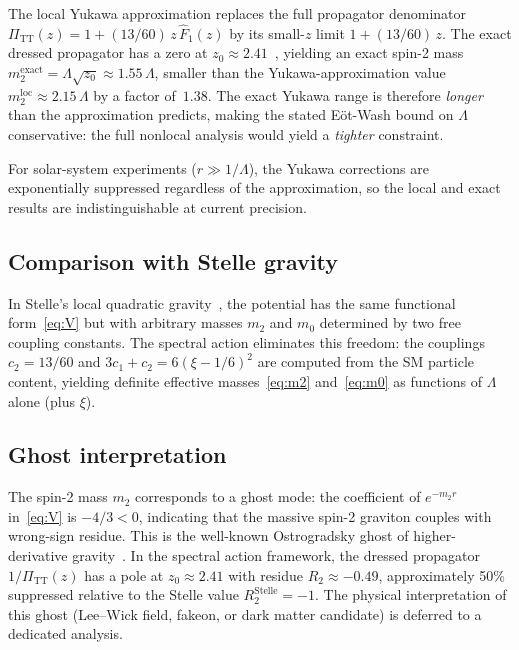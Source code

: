 \documentclass[aps,prd,twocolumn,superscriptaddress,nofootinbib,floatfix]{revtex4-2}
\newcommand{\PiTT}{\Pi_{\mathrm{TT}}}
\begin{document}
The local Yukawa approximation replaces the full propagator denominator
$\PiTT(z) = 1 + (13/60)\,z\,\hat{F}_1(z)$ by its small-$z$ limit
$1 + (13/60)\,z$.  The exact dressed propagator has a zero at
$z_0 \approx 2.41$~\cite{Alfyorov:2026ff}, yielding an exact spin-2
mass $m_2^{\mathrm{exact}} = \Lambda\sqrt{z_0} \approx 1.55\,\Lambda$,
smaller than the Yukawa-approximation value
$m_2^{\mathrm{loc}} \approx 2.15\,\Lambda$ by a factor of~$1.38$.
The exact Yukawa range is therefore \emph{longer} than the
approximation predicts, making the stated E\"ot-Wash bound on
$\Lambda$ conservative: the full nonlocal analysis would yield a
\emph{tighter} constraint.

For solar-system experiments ($r \gg 1/\Lambda$), the Yukawa
corrections are exponentially suppressed regardless of the
approximation, so the local and exact results are indistinguishable at
current precision.

\subsection{Comparison with Stelle gravity}

In Stelle's local quadratic gravity~\cite{Stelle:1976gc,Stelle:1978},
the potential has the same functional form~\eqref{eq:V} but with
arbitrary masses $m_2$ and $m_0$ determined by two free coupling
constants. The spectral action eliminates this freedom: the couplings
$c_2 = 13/60$ and $3c_1 + c_2 = 6(\xi-1/6)^2$ are computed from the
SM particle content, yielding definite effective masses~\eqref{eq:m2}
and~\eqref{eq:m0} as functions of $\Lambda$ alone (plus $\xi$).

\subsection{Ghost interpretation}

The spin-2 mass $m_2$ corresponds to a ghost mode: the coefficient of
$e^{-m_2 r}$ in~\eqref{eq:V} is $-4/3 < 0$, indicating that the massive
spin-2 graviton couples with wrong-sign residue. This is the well-known
Ostrogradsky ghost of higher-derivative
gravity~\cite{Stelle:1976gc,Woodard:2015zca}.
In the spectral action framework, the dressed propagator
$1/\PiTT(z)$ has a pole at $z_0 \approx 2.41$ with residue
$R_2 \approx -0.49$, approximately 50\% suppressed relative to the
Stelle value $R_2^{\mathrm{Stelle}} = -1$.
The physical interpretation of this ghost (Lee--Wick field, fakeon, or
dark matter candidate) is deferred to a dedicated analysis.
\end{document}
